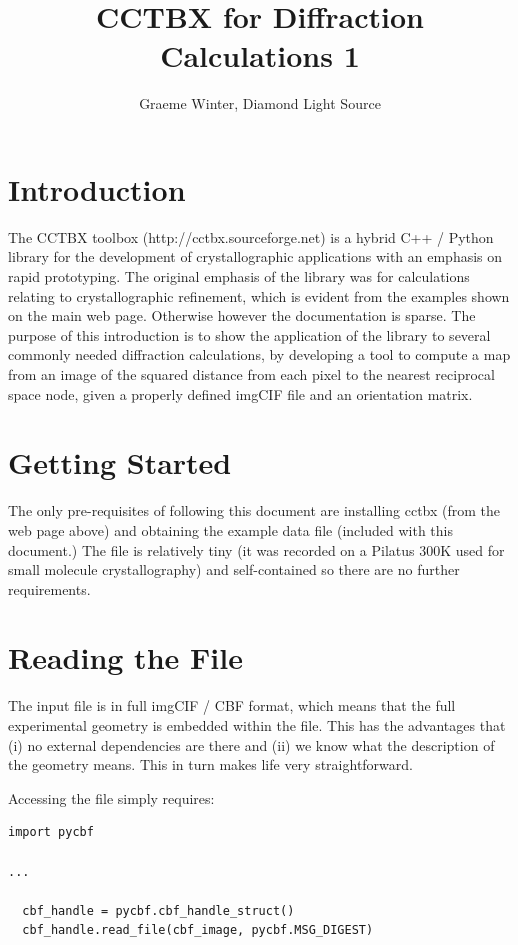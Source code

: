 \documentclass[a4paper, 11pt]{article}
\title{CCTBX for Diffraction Calculations 1}
\author{Graeme Winter, Diamond Light Source}
\begin{document}
\maketitle

\section{Introduction}

The CCTBX toolbox (http://cctbx.sourceforge.net) is a hybrid C++ / Python library for the development of crystallographic applications with an emphasis on rapid prototyping. The original emphasis of the library was for calculations relating to crystallographic refinement, which is evident from the examples shown on the main web page. Otherwise however the documentation is sparse. The purpose of this introduction is to show the application of the library to several commonly needed diffraction calculations, by developing a tool to compute a map from an image of the squared distance from each pixel to the nearest reciprocal space node, given a properly defined imgCIF file and an orientation matrix.

\section{Getting Started}

The only pre-requisites of following this document are installing cctbx (from the web page above) and obtaining the example data file (included with this document.) The file is relatively tiny (it was recorded on a Pilatus 300K used for small molecule crystallography) and self-contained so there are no further requirements. 

\section{Reading the File}

The input file is in full imgCIF / CBF format, which means that the full experimental geometry is embedded within the file. This has the advantages that (i) no external dependencies are there and (ii) we know what the description of the geometry means. This in turn makes life very straightforward. 

Accessing the file simply requires:

{\small
\begin{verbatim}
import pycbf

...

  cbf_handle = pycbf.cbf_handle_struct()
  cbf_handle.read_file(cbf_image, pycbf.MSG_DIGEST)
\end{verbatim}
}
\end{document}

